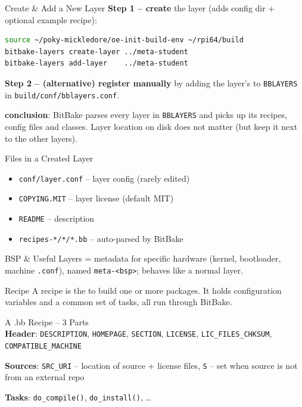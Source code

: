 \begin{KR}{Create \& Add a New Layer}
    \textbf{Step 1 -- create} the layer (adds config dir + optional example recipe):
\begin{lstlisting}[language=bash, style=basesmol, aboveskip=2pt, belowskip=2pt]
source ~/poky-mickledore/oe-init-build-env ~/rpi64/build
bitbake-layers create-layer ../meta-student
bitbake-layers add-layer    ../meta-student
\end{lstlisting}
    \textbf{Step 2 -- (alternative) register manually} by adding the layer's
     to \texttt{BBLAYERS} in \texttt{build/conf/bblayers.conf}.

    \textbf{conclusion}:
    BitBake parses every layer in \texttt{BBLAYERS} and picks up its recipes,
    config files and classes. Layer location on disk does not matter (but keep
    it next to the other layers).
\end{KR}


\begin{definition}{Files in a Created Layer}
    \begin{itemize}
        \item \texttt{conf/layer.conf} -- layer config (rarely edited)
        \item \texttt{COPYING.MIT} -- layer license (default MIT)
        \item \texttt{README} -- description
        \item \texttt{recipes-*/*/*.bb} -- auto-parsed by BitBake
    \end{itemize}
\end{definition}

\begin{definition}{BSP \& Useful Layers}
     = metadata for specific hardware (kernel, bootloader,
    machine \texttt{.conf}), named \texttt{meta-<bsp>}; behaves like a normal layer.
\end{definition}

\multend

\begin{concept}{Recipe}
    A recipe is the  to
    build one or more packages. It holds configuration variables and a common set
    of tasks, all run through BitBake.
\end{concept}


\begin{definition}{A .bb Recipe -- 3 Parts}\\
    \textbf{Header}: \texttt{DESCRIPTION}, \texttt{HOMEPAGE}, \texttt{SECTION}, \texttt{LICENSE}, \texttt{LIC\_FILES\_CHKSUM}, \texttt{COMPATIBLE\_MACHINE}
 
    \textbf{Sources}: \texttt{SRC\_URI} -- location of source + license files, \texttt{S} -- set when source is not from an external repo

    \textbf{Tasks}: \texttt{do\_compile()}, \texttt{do\_install()}, \dots
\end{definition}

